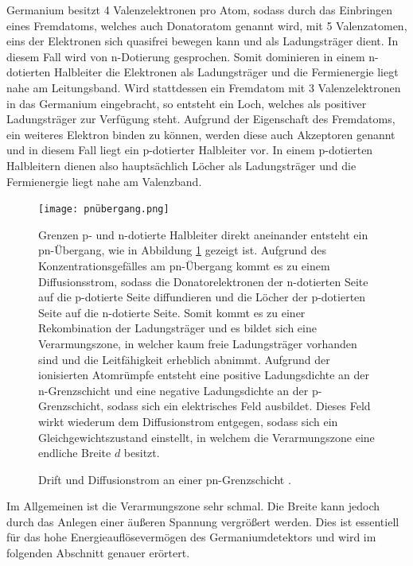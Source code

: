 Germanium besitzt 4 Valenzelektronen pro Atom, sodass durch das Einbringen eines Fremdatoms, welches auch Donatoratom genannt wird, mit 5 Valenzatomen, eins der Elektronen sich quasifrei bewegen kann und als Ladungsträger dient.
In diesem Fall wird von n-Dotierung gesprochen.
Somit dominieren in einem n-dotierten Halbleiter die Elektronen als Ladungsträger und die Fermienergie liegt nahe am Leitungsband.
Wird stattdessen ein Fremdatom mit 3 Valenzelektronen in das Germanium eingebracht, so entsteht ein Loch, welches als positiver Ladungsträger zur Verfügung steht.
Aufgrund der Eigenschaft des Fremdatoms, ein weiteres Elektron binden zu können, werden diese auch Akzeptoren genannt und in diesem Fall liegt ein p-dotierter Halbleiter vor.
In einem p-dotierten Halbleitern dienen also hauptsächlich Löcher als Ladungsträger und die Fermienergie liegt nahe am Valenzband.

\FloatBarrier
\begin{figure}[h]
\begin{minipage}[t]{0.45\textwidth}
\vspace{10pt}
\centering
\texttt{[image: pnübergang.png]}
\caption{Drift und Diffusionstrom an einer pn-Grenzschicht \cite{quelle03}.}
\label{fig:tfig6}
\end{minipage}
\hfill
\begin{minipage}[t]{0.53\textwidth}
\vspace{0pt}
Grenzen p- und n-dotierte Halbleiter direkt aneinander entsteht ein pn-Übergang, wie in Abbildung \ref{fig:tfig6} gezeigt ist.
Aufgrund des Konzentrationsgefälles am pn-Übergang kommt es zu einem Diffusionsstrom, sodass die Donatorelektronen der n-dotierten Seite auf die p-dotierte Seite diffundieren und die Löcher der p-dotierten Seite auf die n-dotierte Seite.
Somit kommt es zu einer Rekombination der Ladungsträger und es bildet sich eine Verarmungszone, in welcher kaum freie Ladungsträger vorhanden sind und die Leitfähigkeit erheblich abnimmt.
Aufgrund der ionisierten Atomrümpfe entsteht eine positive Ladungsdichte an der n-Grenzschicht und eine negative Ladungsdichte an der p-Grenzschicht, sodass sich ein elektrisches Feld ausbildet.
Dieses Feld wirkt wiederum dem Diffusionstrom entgegen, sodass sich ein Gleichgewichtszustand einstellt, in welchem die Verarmungszone eine endliche Breite $d$ besitzt.
\end{minipage}
\end{figure}
\FloatBarrier
Im Allgemeinen ist die Verarmungszone sehr schmal. 
Die Breite kann jedoch durch das Anlegen einer äußeren Spannung vergrößert werden. 
Dies ist essentiell für das hohe Energieauflösevermögen des Germaniumdetektors und wird im folgenden Abschnitt genauer erörtert.

